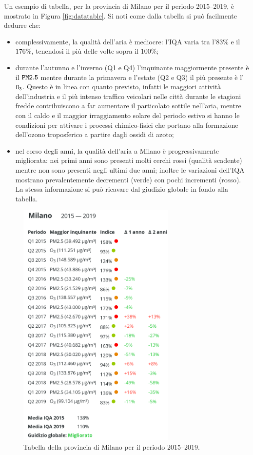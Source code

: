 Un esempio di tabella, per la provincia di Milano per il periodo 2015--2019, è
mostrato in Figura \vref{fig:datatable}. Si noti come dalla tabella si può
facilmente dedurre che:
\begin{itemize}
	\item complessivamente, la qualità dell'aria è mediocre: l'IQA varia tra
		l'\(83\%\) e il \(176\%\), tenendosi il più delle volte sopra il
		\(100\%\);
	\item durante l'autunno e l'inverno (Q1 e Q4) l'inquinante maggiormente
		presente è il \(\mathtt{PM2.5}\) mentre durante la primavera e
		l'estate (Q2 e Q3) il più presente è l'\(\mathtt{O_3}\). Questo è
		in linea con quanto previsto, infatti le maggiori attività
		dell'industria e il più intenso traffico veicolari nelle città
		durante le stagioni fredde contribuiscono a far aumentare il
		particolato sottile nell'aria, mentre con il caldo e il maggior
		irraggiamento solare del periodo estivo si hanno le condizioni
		per attivare i processi chimico-fisici che portano alla
		formazione dell'ozono troposferico a partire dagli ossidi di
		azoto;
	\item nel corso degli anni, la qualità dell'aria a Milano è
		progressivamente migliorata: nei primi anni sono presenti molti
		cerchi rossi (qualità scadente) mentre non sono presenti negli
		ultimi due anni; inoltre le variazioni dell'IQA mostrano
		prevalentemente decrementi (verde) con pochi incrementi (rosso).
		La stessa informazione si può ricavare dal giudizio globale in
		fondo alla tabella.
\end{itemize}

\begin{figure}[htp]
	\centering
	\includegraphics[width=0.7\textwidth]{img/datatable}
	\caption{Tabella della provincia di Milano per il periodo
	2015--2019.}\label{fig:datatable}
\end{figure}

